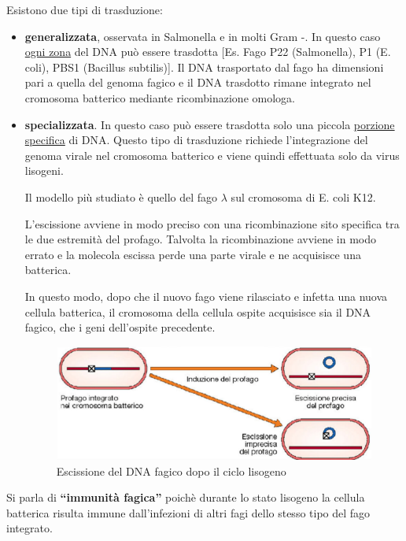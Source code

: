 \documentclass[11pt]{book}
\begin{document}
Esistono due tipi di trasduzione: 
\begin{itemize}
\item \textbf{generalizzata}, osservata in Salmonella e in molti Gram -. In questo caso \underline{ogni zona} del DNA può essere trasdotta [Es. Fago P22 (Salmonella), P1 (E. coli), PBS1 (Bacillus subtilis)]. Il DNA trasportato dal fago ha dimensioni pari a quella del genoma fagico e il DNA trasdotto rimane integrato nel cromosoma batterico mediante ricombinazione omologa.

\item \textbf{specializzata}. In questo caso può essere trasdotta solo una piccola \underline{porzione specifica} di DNA. Questo tipo di trasduzione richiede l’integrazione del genoma virale nel cromosoma batterico e viene quindi effettuata solo da virus lisogeni. 

Il modello più studiato è quello del fago $\lambda$  sul cromosoma di E. coli K12.

L’escissione avviene in modo preciso con una ricombinazione sito specifica tra le due estremità del profago. Talvolta la ricombinazione avviene in modo errato e la molecola escissa perde una parte virale e ne acquisisce una batterica.

In questo modo, dopo che il nuovo fago viene rilasciato e infetta una nuova cellula batterica, il cromosoma della cellula ospite acquisisce sia il DNA fagico, che i geni dell'ospite precedente.

\clearpage
\begin{figure}[htp]
\centering
\includegraphics[scale=0.5]{img/Trasduzione specializzata.png}
\caption{Escissione del DNA fagico dopo il ciclo lisogeno}
\label{}
\end{figure}

\end{itemize}

Si parla di \textbf{``immunità fagica''} poichè durante lo stato lisogeno la cellula batterica risulta immune dall'infezioni di altri fagi dello stesso tipo del fago integrato.
\end{document}
